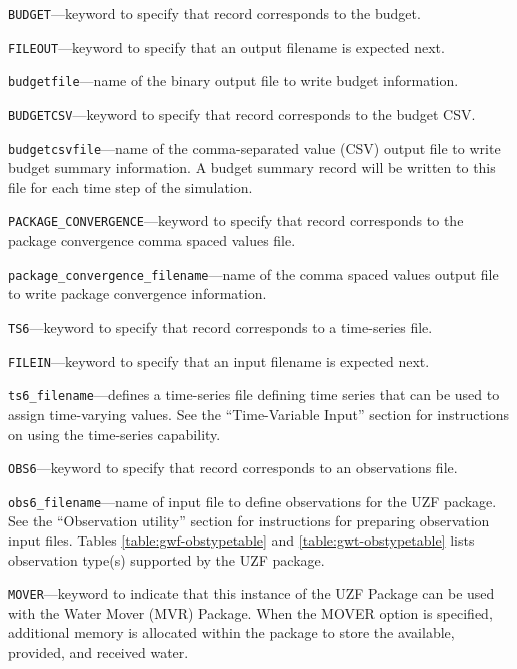 \begin{description}
\item \texttt{BUDGET}---keyword to specify that record corresponds to the budget.

\item \texttt{FILEOUT}---keyword to specify that an output filename is expected next.

\item \texttt{budgetfile}---name of the binary output file to write budget information.

\item \texttt{BUDGETCSV}---keyword to specify that record corresponds to the budget CSV.

\item \texttt{budgetcsvfile}---name of the comma-separated value (CSV) output file to write budget summary information.  A budget summary record will be written to this file for each time step of the simulation.

\item \texttt{PACKAGE\_CONVERGENCE}---keyword to specify that record corresponds to the package convergence comma spaced values file.

\item \texttt{package\_convergence\_filename}---name of the comma spaced values output file to write package convergence information.

\item \texttt{TS6}---keyword to specify that record corresponds to a time-series file.

\item \texttt{FILEIN}---keyword to specify that an input filename is expected next.

\item \texttt{ts6\_filename}---defines a time-series file defining time series that can be used to assign time-varying values. See the ``Time-Variable Input'' section for instructions on using the time-series capability.

\item \texttt{OBS6}---keyword to specify that record corresponds to an observations file.

\item \texttt{obs6\_filename}---name of input file to define observations for the UZF package. See the ``Observation utility'' section for instructions for preparing observation input files. Tables \ref{table:gwf-obstypetable} and \ref{table:gwt-obstypetable} lists observation type(s) supported by the UZF package.

\item \texttt{MOVER}---keyword to indicate that this instance of the UZF Package can be used with the Water Mover (MVR) Package.  When the MOVER option is specified, additional memory is allocated within the package to store the available, provided, and received water.


\end{description}
